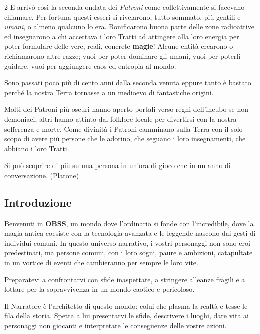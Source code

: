 \begin{multicols}{2}
E arrivò così la seconda ondata dei \emph{Patroni} come collettivamente si facevano chiamare. Per fortuna questi esseri si rivelarono, tutto sommato, più gentili e \emph{umani}, o almeno qualcuno lo era. Bonificarono buona parte delle zone radioattive ed insegnarono a chi accettava i loro Tratti ad attingere alla loro energia per poter formulare delle vere, reali, concrete \textbf{magie}!
Alcune entità crearono o richiamarono altre razze; vuoi per poter dominare gli umani, vuoi per poterli guidare, vuoi per aggiungere caos ed entropia al mondo.

Sono passati poco più di cento anni dalla seconda venuta eppure tanto è bastato perché la nostra Terra tornasse a un medioevo di fantastiche origini.

Molti dei Patroni più oscuri hanno aperto portali verso regni dell'incubo se non demoniaci, altri hanno attinto dal folklore locale per divertirsi con la nostra sofferenza e morte. Come divinità i Patroni camminano sulla Terra con il solo scopo di avere più persone che le adorino, che seguano i loro insegnamenti, che abbiano i loro Tratti.

\medskip

\begin{enfasi}{Si può scoprire di più su una persona in un'ora di gioco che in un anno di conversazione. (Platone)}\end{enfasi}

\subsection{Introduzione}

Benvenuti in \textbf{OBSS}, un mondo dove l'ordinario si fonde con l'incredibile, dove la magia antica coesiste con la tecnologia avanzata e le leggende nascono dai gesti di individui comuni. In questo universo narrativo, i vostri personaggi non sono eroi predestinati, ma persone comuni, con i loro sogni, paure e ambizioni, catapultate in un vortice di eventi che cambieranno per sempre le loro vite.

Preparatevi a confrontarvi con sfide inaspettate, a stringere alleanze fragili e a lottare per la sopravvivenza in un mondo caotico e pericoloso.

Il Narratore è l’architetto di questo mondo: colui che plasma la realtà e tesse le fila della storia.
Spetta a lui presentarvi le sfide, descrivere i luoghi, dare vita ai personaggi non giocanti e interpretare le conseguenze delle vostre azioni.


\end{multicols}
